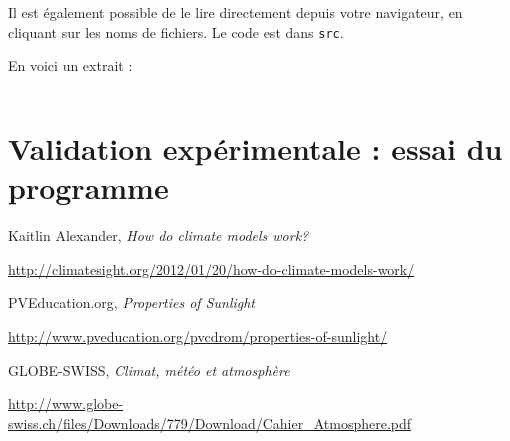 \documentclass[12pt]{article}
\begin{document}
Il est également possible de le lire directement depuis votre navigateur, en cliquant sur les noms de fichiers. Le code est dans \texttt{src}.

En voici un extrait :

\inputminted[linenos]{rust}{temperature.rs}

\section{Validation expérimentale : essai du programme}



\begin{thebibliography}{9}

Kaitlin Alexander, \textit{How do climate models work?}

\url{http://climatesight.org/2012/01/20/how-do-climate-models-work/}


PVEducation.org, \textit{Properties of Sunlight}

\url{http://www.pveducation.org/pvcdrom/properties-of-sunlight/}


GLOBE-SWISS, \textit{Climat, météo et atmosphère}

\url{http://www.globe-swiss.ch/files/Downloads/779/Download/Cahier_Atmosphere.pdf}



\end{thebibliography}
\end{document}

